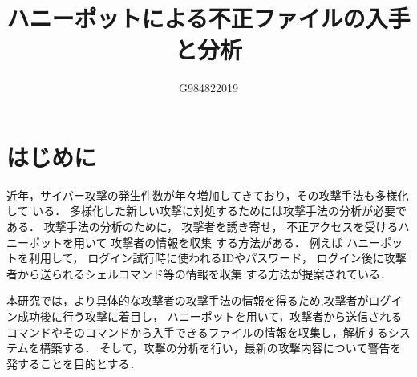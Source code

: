 \documentclass{entry}
\title{ハニーポットによる不正ファイルの入手と分析}
\author{G984822019}{吉村　直将}
\begin{document}
\maketitle

\section{はじめに}

近年，サイバー攻撃の発生件数が年々増加してきており，その攻撃手法も多様化して
いる．
多様化した新しい攻撃に対処するためには攻撃手法の分析が必要である．
攻撃手法の分析のために，  
攻撃者を誘き寄せ，
不正アクセスを受けるハニーポットを用いて
攻撃者の情報を収集
する方法がある．
例えば
ハニーポットを利用して，
ログイン試行時に使われるIDやパスワード，
ログイン後に攻撃者から送られるシェルコマンド等の情報を収集
する方法が提案されている\cite{Entry}．





本研究では，より具体的な攻撃者の攻撃手法の情報を得るため,攻撃者がログイン成功後に行う攻撃に着目し，
ハニーポットを用いて，攻撃者から送信されるコマンドやそのコマンドから入手できるファイルの情報を収集し，解析するシステムを構築する．
そして，攻撃の分析を行い，最新の攻撃内容について警告を発することを目的とする．
\end{document}
